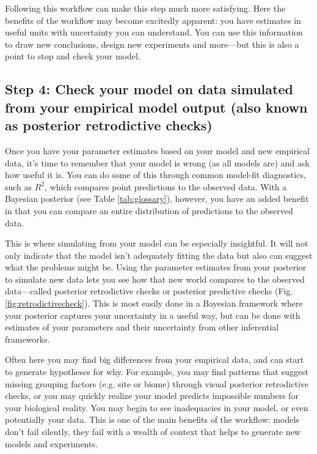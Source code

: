 \documentclass[11pt]{article}
\begin{document}
Following this workflow can make this step much more satisfying. Here the benefits of the workflow may become excitedly apparent: you have estimates in useful units with uncertainty you can understand. You can use this information to draw new conclusions, design new experiments and more---but this is also a point to stop and check your model. 

\subsection*{Step 4: Check your model on data simulated from your empirical model output (also known as posterior retrodictive checks)} 

Once you have your parameter estimates based on your model and new empirical data, it's time to remember that your model is wrong (as all models are) and ask how useful it is. You can do some of this through common model-fit diagnostics, such as $R^2$, which compares point predictions to the observed data. With a Bayesian posterior (see Table \ref{tab:glossary}), however, you have an added benefit in that you can compare an entire distribution of predictions to the observed data. 

This is where simulating from your model can be especially insightful. It will not only indicate that the model isn't adequately fitting the data but also can suggest what the problems might be. Using the parameter estimates from your posterior to simulate new data \citep[][]{held2010,gelman200ppc,conn2018} lets you see how that new world compares to the observed data---called posterior retrodictive checks or posterior predictive checks (Fig. \ref{fig:retrodictivecheck}). This is most easily done in a Bayesian framework where your posterior captures your uncertainty in a useful way, but can be done with estimates of your parameters and their uncertainty from other inferential frameworks. 

Often here you may find big differences from your empirical data, and can start to generate hypotheses for why. For example, you may find patterns that suggest missing grouping factors (e.g. site or biome) through visual posterior retrodictive checks, or you may quickly realize your model predicts impossible numbers for your biological reality. You may begin to see inadequacies in your model, or even potentially your data.  This is one of the main benefits of the workflow: models don't fail silently, they fail with a wealth of context that helps to generate new models and experiments.
\end{document}
